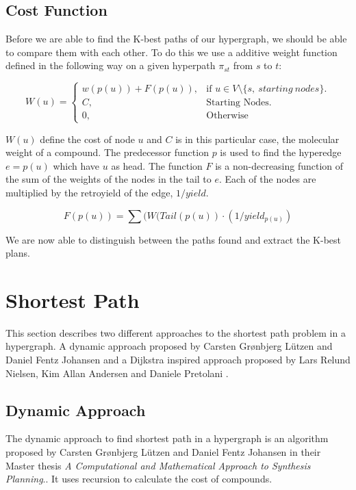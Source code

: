 \documentclass[a4paper,10pt,titlepage]{paper}
\begin{document}
\subsection{Cost Function}
Before we are able to find the K-best paths of our hypergraph, we should be able to compare them with each other. To do this we use a additive weight function defined in the following way on a given hyperpath $\pi_{st}$ from $s$ to $t$:

\begin{equation}
W(u)=\begin{cases}
    w(p(u)) + F(p(u)), & \text{if $u\in V\setminus \{s,\ starting\ nodes\}$}.\\
    C, & \text{Starting Nodes}. \\
    0, & \text{Otherwise}
  \end{cases}
\end{equation}

$W(u)$ define the cost of node $u$ and $C$ is in this particular case, the molecular weight of a compound. The predecessor function $p$ is used to find the hyperedge $e=p(u)$ which have $u$ as head. The function $F$ is a non-decreasing function of the sum of the weights of the nodes in the tail to $e$. Each of the nodes are multiplied by the retroyield of the edge, $1/yield$.

\begin{equation}
F(p(u)) = \sum(W(Tail(p(u)) \cdot (1/yield_{p(u)})
\end{equation}

We are now able to distinguish between the paths found and extract the K-best plans. \cite{Carsten}

\section{Shortest Path}
\label{sec::ShortestPath}
This section describes two different approaches to the shortest path problem in a hypergraph. A dynamic approach proposed by Carsten Grønbjerg Lützen and Daniel Fentz Johansen \cite{Carsten} and a Dijkstra inspired approach proposed by Lars Relund Nielsen, Kim Allan Andersen and Daniele Pretolani \cite{Nielsen}. 

\subsection{Dynamic Approach}
The dynamic approach to find shortest path in a hypergraph is an algorithm proposed by Carsten Grønbjerg Lützen and Daniel Fentz Johansen in their Master thesis \textit{A Computational and Mathematical Approach to Synthesis Planning}.\cite{Carsten}. It uses recursion to calculate the cost of compounds.
\end{document}
